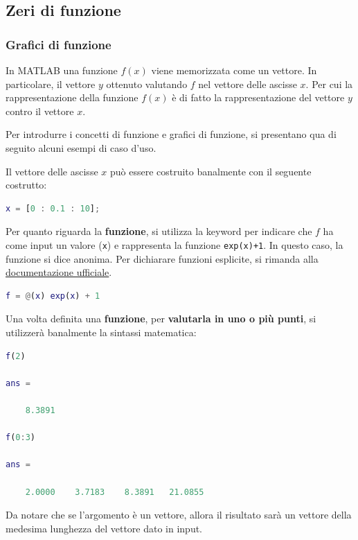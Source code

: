 \subsection{Zeri di funzione}

\subsubsection{Grafici di funzione}

In MATLAB una funzione $f\left(x\right)$ viene memorizzata come un vettore. In particolare, il vettore $y$ ottenuto valutando $f$ nel vettore delle ascisse $x$. Per cui la rappresentazione della funzione $f\left(x\right)$ è di fatto la rappresentazione del vettore $y$ contro il vettore $x$.

\highspace
Per introdurre i concetti di funzione e grafici di funzione, si presentano qua di seguito alcuni esempi di caso d'uso.

\highspace
{}

\noindent
Il vettore delle ascisse $x$ può essere costruito banalmente con il seguente costrutto:
\begin{lstlisting}[language=MATLAB]
x = [0 : 0.1 : 10];\end{lstlisting}
Per quanto riguarda la \textbf{funzione}, si utilizza la keyword \texttt{\@} per indicare che $f$ ha come input un valore (\texttt{x}) e rappresenta la funzione \texttt{exp(x)+1}. In questo caso, la funzione si dice anonima. Per dichiarare funzioni esplicite, si rimanda alla \href{https://it.mathworks.com/help/releases/R2024a/matlab/ref/function_handle.html}{documentazione ufficiale}.
\begin{lstlisting}[language=MATLAB]
f = @(x) exp(x) + 1\end{lstlisting}
Una volta definita una \textbf{funzione}, per \textbf{valutarla in uno o più punti}, si utilizzerà banalmente la sintassi matematica:
\begin{lstlisting}[language=MATLAB]
f(2)

ans =

    8.3891

f(0:3)

ans =

    2.0000    3.7183    8.3891   21.0855\end{lstlisting}
Da notare che se l'argomento è un vettore, allora il risultato sarà un vettore della medesima lunghezza del vettore dato in input.

